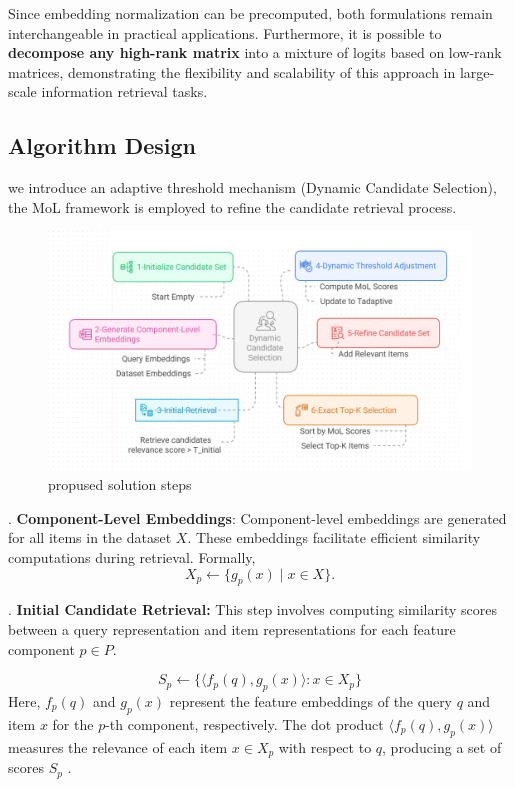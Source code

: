 Since embedding normalization can be precomputed, both formulations remain interchangeable in practical applications. Furthermore, it is possible to \textbf{decompose any high-rank matrix} into a mixture of logits based on low-rank matrices, demonstrating the flexibility and scalability of this approach in large-scale information retrieval tasks.
\subsection{Algorithm Design}
we introduce an adaptive threshold mechanism
(Dynamic Candidate Selection), the MoL framework is employed to refine the
candidate retrieval process. \\
\begin{figure}[ht]
	\centering
	\includegraphics[width=0.7\linewidth]{Figures/propused _solution_steps.png}
	\caption{propused solution steps}
	\label{propused _solution_steps}	
\end{figure}
. \textbf{Component-Level Embeddings}:  
Component-level embeddings are generated for all items in the dataset \(X\). These embeddings facilitate efficient similarity computations during retrieval. Formally,
\begin{equation}
	X_p \leftarrow \{g_p(x) \mid x \in X\}.
\end{equation}

.\textbf{ Initial Candidate Retrieval:} This step involves computing similarity scores between a query representation and item representations for each feature component $p \in P$.  

\begin{equation}
	S_p \gets  \{ \langle f_p(q), g_p(x) \rangle : x \in X_p \}
	\label{eq:initial_retrieval}
\end{equation}
Here, $f_p(q)$ and $g_p(x)$ represent the feature embeddings of the query $q$ and item $x$ for the $p$-th component, respectively. The dot product $\langle f_p(q), g_p(x) \rangle$ measures the relevance of each item $x \in X_p$ with respect to $q$, producing a set of scores $S_p$ .



